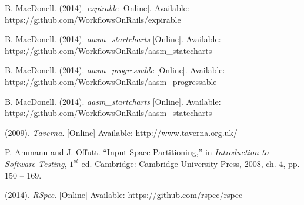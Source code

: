 \begin{thebibliography}{99}
B. MacDonell. (2014). \textit{expirable} [Online]. Available: https://github.com/WorkflowsOnRails/expirable

B. MacDonell. (2014). \textit{aasm\_startcharts} [Online]. Available: https://github.com/WorkflowsOnRails/aasm\_statecharts

B. MacDonell. (2014). \textit{aasm\_progressable} [Online]. Available: https://github.com/WorkflowsOnRails/aasm\_progressable

B. MacDonell. (2014). \textit{aasm\_startcharts} [Online]. Available: https://github.com/WorkflowsOnRails/aasm\_statecharts

(2009). \textit{Taverna}. [Online] Available: http://www.taverna.org.uk/

P. Ammann and J. Offutt. ``Input Space Partitioning,'' in \textit{Introduction to Software Testing}, $1^{st}$ ed. Cambridge: Cambridge University Press, 2008, ch. 4, pp. 150 -- 169.

(2014). \textit{RSpec}. [Online] Available: https://github.com/rspec/rspec


\end{thebibliography}

%    
%    

